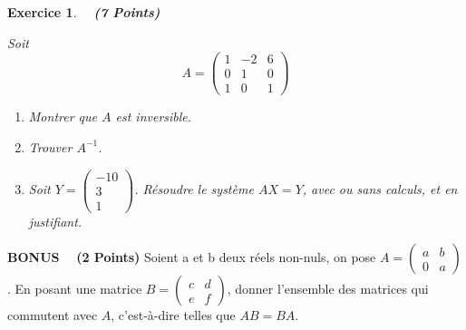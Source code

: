 \documentclass[12pt,fleqn]{report}
\newcommand{\hr}{\hrulefill}
\newtheorem{EX}{Exercice}
\newenvironment{exau}{\begin{EX} \normalfont}{\end{EX}}
\begin{document}
\begin{exau}
		\ \hr \ \textbf{(7 Points)}

Soit 
$$
A=\begin{pmatrix}
1&-2&6\\ 0&1&0\\ 1&0&1
\end{pmatrix}
$$
\begin{enumerate}
\item[${\rm a)}$] Montrer que $A$ est inversible. 
\item[${\rm b)}$] Trouver $A^{-1}$. 
\item[${\rm c)}$] Soit $\displaystyle{Y=\begin{pmatrix}-10\\ 3\\1 \end{pmatrix}}$. Résoudre le système $AX=Y$, avec ou sans calculs, et en justifiant.
\end{enumerate}

\end{exau}
\textbf{\large{BONUS}} \ \hr \ \textbf{(2 Points)}
\newline
Soient a et b deux réels non-nuls, on pose $A=\begin{pmatrix} a & b \\ 0&a \end{pmatrix}$. En posant une matrice $B=\begin{pmatrix} c &d \\ e&f \end{pmatrix}$, donner l'ensemble des matrices qui commutent avec $A$, c'est-à-dire telles que $AB=BA$.
\end{document}
